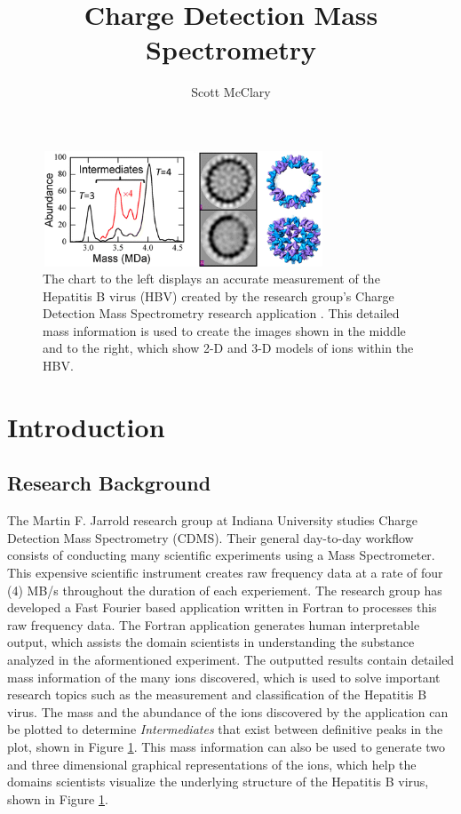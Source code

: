 \documentclass[9pt,twocolumn,twoside]{../../styles/osajnl}
\title{Charge Detection Mass Spectrometry}
\author[1,*]{Scott McClary}
\affil[1]{School of Informatics and Computing, Bloomington, IN 47408, U.S.A.}
\affil[*]{Corresponding authors: scmcclar@indiana.edu}
\begin{document}
\maketitle

\begin{figure}
\centering
\includegraphics[height=1.35in, width=3.3in]{images/hbvassembly}
\caption{The chart to the left displays an accurate measurement of the
  Hepatitis B virus (HBV) created by the research group's Charge
  Detection Mass Spectrometry research application \cite{247}. This
  detailed mass information is used to create the images shown in the
  middle and to the right, which show 2-D and 3-D models of ions
  within the HBV.}
\label{fig:hbvassembly}
\end{figure}

\section{Introduction} \label{introduction}
\subsection{Research Background} \label{research-background}
The Martin F. Jarrold research group at Indiana University studies
Charge Detection Mass Spectrometry (CDMS). Their general day-to-day
workflow consists of conducting many scientific experiments using a
Mass Spectrometer. This expensive scientific instrument creates raw
frequency data at a rate of four (4) MB/s throughout the duration of
each experiement. The research group has developed a Fast Fourier
based application written in Fortran to processes this raw frequency
data. The Fortran application generates human interpretable output,
which assists the domain scientists in understanding the substance
analyzed in the aformentioned experiment. The outputted results
contain detailed mass information of the many ions discovered, which
is used to solve important research topics such as the measurement and
classification of the Hepatitis B virus. The mass and the abundance of
the ions discovered by the application can be plotted to determine
\emph{Intermediates} that exist between definitive peaks in the plot,
shown in Figure \ref{fig:hbvassembly}. This mass information can also
be used to generate two and three dimensional graphical
representations of the ions, which help the domains scientists
visualize the underlying structure of the Hepatitis B virus, shown in
Figure \ref{fig:hbvassembly}.
\end{document}
